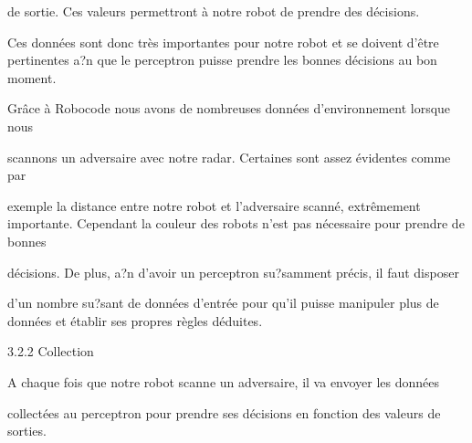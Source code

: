 \documentclass[a4paper,portrait,12pt]{article}
\begin{document}
\begin{flushleft}
de sortie. Ces valeurs permettront \`{a} notre robot de prendre des d\'{e}cisions.
\end{flushleft}


\begin{flushleft}
Ces donn\'{e}es sont donc tr\`{e}s importantes pour notre robot et se doivent d'\^{e}tre pertinentes a?n que le perceptron puisse prendre les bonnes d\'{e}cisions au bon moment.
\end{flushleft}


\begin{flushleft}
Gr\^{a}ce \`{a} Robocode nous avons de nombreuses donn\'{e}es d'environnement lorsque nous
\end{flushleft}


\begin{flushleft}
scannons un adversaire avec notre radar. Certaines sont assez \'{e}videntes comme par
\end{flushleft}


\begin{flushleft}
exemple la distance entre notre robot et l'adversaire scann\'{e}, extr\^{e}mement importante. Cependant la couleur des robots n'est pas n\'{e}cessaire pour prendre de bonnes
\end{flushleft}


\begin{flushleft}
d\'{e}cisions. De plus, a?n d'avoir un perceptron su?samment pr\'{e}cis, il faut disposer
\end{flushleft}


\begin{flushleft}
d'un nombre su?sant de donn\'{e}es d'entr\'{e}e pour qu'il puisse manipuler plus de donn\'{e}es et \'{e}tablir ses propres r\`{e}gles d\'{e}duites.
\end{flushleft}





\begin{flushleft}
3.2.2 Collection
\end{flushleft}


\begin{flushleft}
A chaque fois que notre robot scanne un adversaire, il va envoyer les donn\'{e}es
\end{flushleft}


\begin{flushleft}
collect\'{e}es au perceptron pour prendre ses d\'{e}cisions en fonction des valeurs de sorties.
\end{flushleft}
\end{document}
